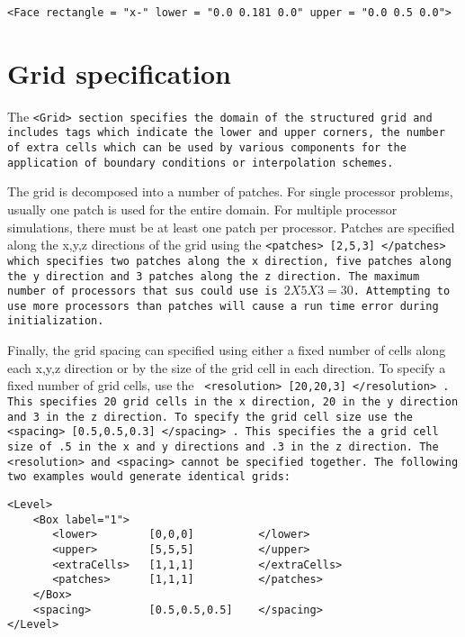 \begin{Verbatim}[fontsize=\footnotesize]
 <Face rectangle = "x-" lower = "0.0 0.181 0.0" upper = "0.0 0.5 0.0">
\end{Verbatim}

%
\section{Grid specification} \label{Sec:Grid}

The \tt <Grid> \normalfont section specifies the domain of the
structured grid and includes tags which indicate the lower and upper
corners, the number of extra cells which can be used by various
components for the application of boundary conditions or interpolation
schemes.  

The grid is decomposed into a number of patches.  For single processor
problems, usually one patch is used for the entire domain.  For
multiple processor simulations, there must be at least one patch per
processor.  Patches are specified along the x,y,z directions of the
grid using the \tt <patches> [2,5,3] </patches> \normalfont which
specifies two patches along the x direction, five patches along the y
direction and 3 patches along the z direction.  The maximum number of
processors that \tt sus \normalfont could use is $2X5X3 = 30$.
Attempting to use more processors than patches
will cause a run time error during initialization.

Finally, the grid spacing can specified using either a fixed number of
cells along each x,y,z direction or by the size of the grid cell in
each direction.  To specify a fixed number of grid cells, use the \tt
<resolution> [20,20,3] </resolution> \normalfont.  This specifies 20
grid cells in the x direction, 20 in the y direction and 3 in the z
direction.  To specify the grid cell size use the \tt <spacing>
[0.5,0.5,0.3] </spacing> \normalfont.  This specifies the a grid cell
size of .5 in the x and y directions and .3 in the z direction.  The
\tt <resolution> \normalfont and \tt <spacing> \normalfont cannot be
specified together.  The following two examples would generate
identical grids:

\begin{Verbatim}[fontsize=\footnotesize]
<Level>
    <Box label="1">
       <lower>        [0,0,0]          </lower>
       <upper>        [5,5,5]          </upper>
       <extraCells>   [1,1,1]          </extraCells>
       <patches>      [1,1,1]          </patches>
    </Box>
    <spacing>         [0.5,0.5,0.5]    </spacing>
</Level>
\end{Verbatim}

